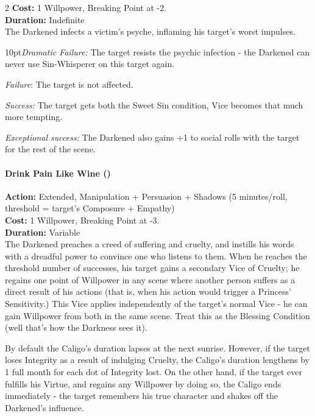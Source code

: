 \begin{multicols}{2}
\noindent \textbf{Cost:} 1 Willpower, Breaking Point at -2.\\

\noindent \textbf{Duration:} Indefinite \\

\noindent The Darkened infects a victim's psyche, inflaming his target's worst impulses.

    \begin{myindentpar}{10pt}\emph{Dramatic Failure:} The target resists the psychic infection - the Darkened can never use Sin-Whisperer on this target again.
    
    \emph{Failure}: The target is not affected.
    
    \emph{Success:} The target gets both the Sweet Sin condition, Vice becomes that much more tempting. 
    
    \emph{Exceptional success:} The Darkened also gains +1 to social rolls with the target for the rest of the scene.\end{myindentpar}

\paragraph*{Drink Pain Like Wine (\textbullet\textbullet\textbullet\textbullet)}

\noindent \textbf{Action:} Extended, Manipulation + Persuasion + Shadows (5 minutes/roll, threshold = target's Composure + Empathy)\\

\noindent \textbf{Cost:} 1 Willpower, Breaking Point at -3.\\

\noindent \textbf{Duration:} Variable \\

\noindent The Darkened preaches a creed of suffering and cruelty, and instills his words with a dreadful power to convince one who listens to them. When he reaches the threshold number of successes, his target gains a secondary Vice of Cruelty; he regains one point of Willpower in any scene where another person suffers as a direct result of his actions (that is, when his action would trigger a Princess' Sensitivity.) This Vice applies independently of the target's normal Vice - he can gain Willpower from both in the same scene. Treat this as the Blessing Condition (well that's how the Darkness sees it).

By default the Caligo's duration lapses at the next sunrise. However, if the target loses Integrity as a result of indulging Cruelty, the Caligo's duration lengthens by 1 full month for each dot of Integrity lost. On the other hand, if the target ever fulfills his Virtue, and regains any Willpower by doing so, the Caligo ends immediately - the target remembers his true character and shakes off the Darkened's influence.\\


\end{multicols}
